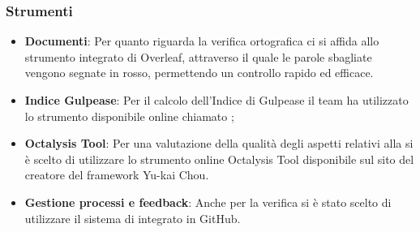 \subsubsection{Strumenti}
    \begin{itemize}
        \item \textbf{Documenti}: Per  quanto  riguarda  la  verifica  ortografica ci si affida allo strumento integrato di Overleaf, attraverso il quale le parole sbagliate vengono segnate in rosso, permettendo un controllo rapido ed efficace.
        
         \item \textbf{Indice Gulpease}: Per il calcolo dell’Indice  di  Gulpease il team ha utilizzato lo strumento disponibile online chiamato ;
         
         \item \textbf{Octalysis Tool}: Per una valutazione della qualità degli aspetti relativi alla  si è scelto di utilizzare lo strumento online Octalysis Tool disponibile sul sito del creatore del framework  Yu-kai Chou.
         
         \item \textbf{Gestione processi e feedback}: Anche per la verifica si è stato scelto di utilizzare il sistema di  integrato in GitHub.
         
         
    \end{itemize}


